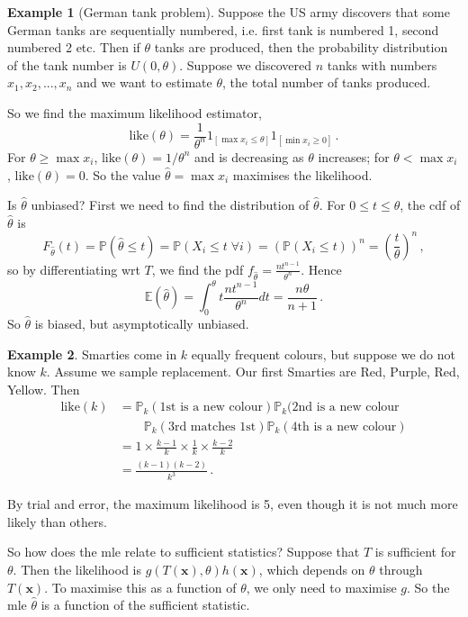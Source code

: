 \documentclass[a4paper,11pt]{article}
\theoremstyle{definition}
\newtheorem*{ex}{Example}
\numberwithin{equation}{section}
\begin{document}
\begin{ex}[German tank problem]
Suppose the US army discovers that some German tanks are sequentially numbered, i.e. first tank is numbered 1, second numbered 2 etc. Then if $\theta$ tanks are produced, then the probability distribution of the tank number is $U(0,\theta)$. Suppose we discovered $n$ tanks with numbers $x_1,x_2,...,x_n$ and we want to estimate $\theta$, the total number of tanks produced.

So we find the maximum likelihood estimator,
\[
\text{like}(\theta)=\frac{1}{\theta^n}1_{[\max x_i\leq\theta]}1_{[\min x_i\geq0]}\,.
\]
For $\theta\geq\max x_i$, $\text{like}(\theta)=1/\theta^n$ and is decreasing as $\theta$ increases; for $\theta<\max x_i$, $\text{like}(\theta)=0$. So the value $\hat{\theta}=\max x_i$ maximises the likelihood.

Is $\hat{\theta}$ unbiased? First we need to find the distribution of $\hat{\theta}$. For $0\leq t\leq\theta$, the cdf of $\hat{\theta}$ is
\[
F_{\hat{\theta}}(t)=\mathbb{P}(\hat{\theta}\leq t)=\mathbb{P}(X_i\leq t\;\forall i)=(\mathbb{P}(X_i\leq t))^n=\left(\frac{t}{\theta}\right)^n\,,
\]
so by differentiating wrt $T$, we find the pdf $f_{\hat{\theta}}=\frac{nt^{n-1}}{\theta^n}$. Hence
\[
\mathbb{E}(\hat{\theta})=\int^\theta_0t\frac{nt^{n-1}}{\theta^n} dt=\frac{n\theta}{n+1}\,.
\]
So $\hat{\theta}$ is biased, but asymptotically unbiased.
\end{ex}

\begin{ex}
Smarties come in $k$ equally frequent colours, but suppose we do not know $k$. Assume we sample replacement. Our first Smarties are Red, Purple, Red, Yellow. Then
\begin{align*}
    \text{like}(k)&=\mathbb{P}_k(\text{1st is a new colour})\mathbb{P}_k(\text{2nd is a new colour}\\
    &\qquad\mathbb{P}_k(\text{3rd matches 1st})\mathbb{P}_k(\text{4th is a new colour})\\
    &=1\times\frac{k-1}{k}\times\frac{1}{k}\times\frac{k-2}{k}\\
    &=\frac{(k-1)(k-2)}{k^3}\,.
\end{align*}

By trial and error, the maximum likelihood is 5, even though it is not much more likely than others.
\end{ex}

So how does the mle relate to sufficient statistics? Suppose that $T$ is sufficient for $\theta$. Then the likelihood is $g(T(\mathbf{x}),\theta)h(\mathbf{x})$, which depends on $\theta$ through $T(\mathbf{x})$. To maximise this as a function of $\theta$, we only need to maximise $g$. So the mle $\hat{\theta}$ is a function of the sufficient statistic.
\end{document}
